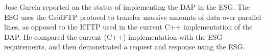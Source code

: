 Jose Garcia reported on the status of implementing the \ac{DAP} 
in the \ac{ESG}. The \ac{ESG} uses the GridFTP protocol to transfer
massive amounts of data over parallel lines, as opposed to the
\ac{HTTP} used in the current C++ implementation of the DAP.
He compared the current (C++) implementation
with the \ac{ESG} requirements, and then demonstrated a request
and response using the \ac{ESG}. 
%
%
%
%

